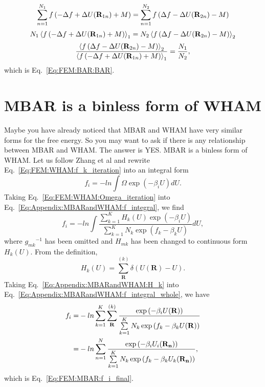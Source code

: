 \begin{appendices}
\begin{equation}
\end{equation}
\begin{equation}
\sum\limits_{n=1}^{N_1}f\left(-\Delta f+\Delta U(\mathbf{R}_{1n})+M\right)=\sum\limits_{n=1}^{N_2} f\left(\Delta f-\Delta U(\mathbf{R}_{2n})-M\right)\notag
\end{equation}
\begin{equation}
N_1\left<f\left(-\Delta f+\Delta U(\mathbf{R}_{1n})+M\right)\right>_1=N_2\left<f\left(\Delta f-\Delta U(\mathbf{R}_{2n})-M\right)\right>_2\notag
\end{equation}
\begin{equation}
\frac{\left<f\left(\Delta f-\Delta U(\mathbf{R}_{2n})-M\right)\right>_2}{\left<f\left(-\Delta f+\Delta U(\mathbf{R}_{1n})+M\right)\right>_1}=\frac{N_1}{N_2},\notag
\end{equation}
which is Eq.~\ref{Eq:FEM:BAR:BAR}.

\chapter{MBAR is a binless form of WHAM\label{chapter:Appendix:MBARandWHAM}}
Maybe you have already noticed that MBAR and WHAM have very similar forms for the free energy. 
So you may want to ask if there is any relationship between MBAR and WHAM. The answer is YES. 
MBAR is a binless form of WHAM.\cite{TanJCP2012} Let us follow Zhang et al\cite{ZhangMS2016} 
and rewrite Eq.~\ref{Eq:FEM:WHAM:f_k_iteration} into an integral form
\begin{equation}
f_i=-ln\int\Omega\exp{(-\beta_iU)}dU.
\label{Eq:Appendix:MBARandWHAM:f_integral}
\end{equation}
Taking Eq.~\ref{Eq:FEM:WHAM:Omega_iteration} into Eq.~\ref{Eq:Appendix:MBARandWHAM:f_integral}, we find
\begin{equation}
f_i=-ln\int\frac{\sum\limits_{k=1}^{K}H_k(U)\exp{(-\beta_iU)}}{\sum\limits_{k=1}^{K}N_k\exp{(f_k-\beta_kU)}}dU,
\label{Eq:Appendix:MBARandWHAM:f_integral_whole}
\end{equation}
where ${g_{mk}}^{-1}$ has been omitted and $H_{mk}$ has been changed to continuous form $H_k(U)$. From the definition,
\begin{equation}
H_k(U)=\sum\limits_{\mathbf{R}}^{(k)}\delta (U(\mathbf{R})-U).
\label{Eq:Appendix:MBARandWHAM:H_k}
\end{equation}
Taking Eq.~\ref{Eq:Appendix:MBARandWHAM:H_k} into Eq.~\ref{Eq:Appendix:MBARandWHAM:f_integral_whole}, we have
\begin{align}
f_i=&-ln\sum\limits_{k=1}^{K}\sum\limits_{\mathbf{R}}^{(k)}\frac{\exp{(-\beta_iU(\mathbf{R}))}}{\sum\limits_{k=1}^{K}N_k\exp{(f_k-\beta_kU(\mathbf{R}))}}\notag\\
   =&-ln\sum\limits_{n=1}^{N}\frac{\exp{(-\beta_iU_i(\mathbf{R_n}))}}{\sum\limits_{k=1}^{K}N_k\exp{(f_k-\beta_kU_k(\mathbf{R_n}))}},
\end{align}
which is Eq.~\ref{Eq:FEM:MBAR:f_i_final}.

\end{appendices}
